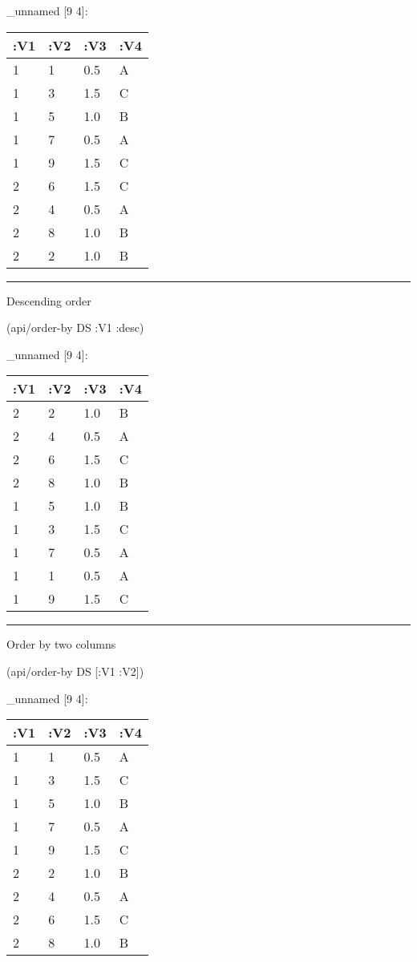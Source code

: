 \documentclass[]{article}
\newenvironment{Shaded}{\begin{snugshade}}{\end{snugshade}}
\newcommand{\AttributeTok}[1]{\textcolor[rgb]{0.77,0.63,0.00}{#1}}
\newcommand{\NormalTok}[1]{#1}
\begin{document}
\_unnamed {[}9 4{]}:

\begin{longtable}[]{@{}llll@{}}
\toprule
:V1 & :V2 & :V3 & :V4\tabularnewline
\midrule
\endhead
1 & 1 & 0.5 & A\tabularnewline
1 & 3 & 1.5 & C\tabularnewline
1 & 5 & 1.0 & B\tabularnewline
1 & 7 & 0.5 & A\tabularnewline
1 & 9 & 1.5 & C\tabularnewline
2 & 6 & 1.5 & C\tabularnewline
2 & 4 & 0.5 & A\tabularnewline
2 & 8 & 1.0 & B\tabularnewline
2 & 2 & 1.0 & B\tabularnewline
\bottomrule
\end{longtable}

\begin{center}\rule{0.5\linewidth}{0.5pt}\end{center}

Descending order

\begin{Shaded}
\begin{Highlighting}[]
\NormalTok{(api/order-by DS }\AttributeTok{:V1} \AttributeTok{:desc}\NormalTok{)}
\end{Highlighting}
\end{Shaded}

\_unnamed {[}9 4{]}:

\begin{longtable}[]{@{}llll@{}}
\toprule
:V1 & :V2 & :V3 & :V4\tabularnewline
\midrule
\endhead
2 & 2 & 1.0 & B\tabularnewline
2 & 4 & 0.5 & A\tabularnewline
2 & 6 & 1.5 & C\tabularnewline
2 & 8 & 1.0 & B\tabularnewline
1 & 5 & 1.0 & B\tabularnewline
1 & 3 & 1.5 & C\tabularnewline
1 & 7 & 0.5 & A\tabularnewline
1 & 1 & 0.5 & A\tabularnewline
1 & 9 & 1.5 & C\tabularnewline
\bottomrule
\end{longtable}

\begin{center}\rule{0.5\linewidth}{0.5pt}\end{center}

Order by two columns

\begin{Shaded}
\begin{Highlighting}[]
\NormalTok{(api/order-by DS [}\AttributeTok{:V1} \AttributeTok{:V2}\NormalTok{])}
\end{Highlighting}
\end{Shaded}

\_unnamed {[}9 4{]}:

\begin{longtable}[]{@{}llll@{}}
\toprule
:V1 & :V2 & :V3 & :V4\tabularnewline
\midrule
\endhead
1 & 1 & 0.5 & A\tabularnewline
1 & 3 & 1.5 & C\tabularnewline
1 & 5 & 1.0 & B\tabularnewline
1 & 7 & 0.5 & A\tabularnewline
1 & 9 & 1.5 & C\tabularnewline
2 & 2 & 1.0 & B\tabularnewline
2 & 4 & 0.5 & A\tabularnewline
2 & 6 & 1.5 & C\tabularnewline
2 & 8 & 1.0 & B\tabularnewline
\bottomrule
\end{longtable}
\end{document}
